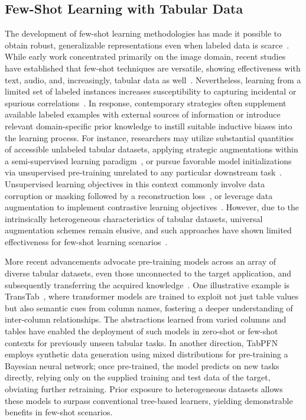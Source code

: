 \subsection{Few-Shot Learning with Tabular Data} The development of few-shot learning methodologies has made it possible to obtain robust, generalizable representations even when labeled data is scarce~\cite{chen2018closer}. While early work concentrated primarily on the image domain, recent studies have established that few-shot techniques are versatile, showing effectiveness with text, audio, and, increasingly, tabular data as well~\cite{majumder2022few,nam2023stunt,schick2021exploiting}. Nevertheless, learning from a limited set of labeled instances increases susceptibility to capturing incidental or spurious correlations~\cite{bartlett2021deep}. In response, contemporary strategies often supplement available labeled examples with external sources of information or introduce relevant domain-specific prior knowledge to instill suitable inductive biases into the learning process. For instance, researchers may utilize substantial quantities of accessible unlabeled tabular datasets, applying strategic augmentations within a semi-supervised learning paradigm~\cite{ucar2021subtab,yoon2020vime}, or pursue favorable model initializations via unsupervised pre-training unrelated to any particular downstream task~\cite{somepalli2021saint}. Unsupervised learning objectives in this context commonly involve data corruption or masking followed by a reconstruction loss~\cite{arik2021tabnet,majmundar2022met}, or leverage data augmentation to implement contrastive learning objectives~\cite{bahri2022scarf,chen2020simple}. However, due to the intrinsically heterogeneous characteristics of tabular datasets, universal augmentation schemes remain elusive, and such approaches have shown limited effectiveness for few-shot learning scenarios~\cite{nam2023stunt}.

More recent advancements advocate pre-training models across an array of diverse tabular datasets, even those unconnected to the target application, and subsequently transferring the acquired knowledge~\cite{zhang2023generative,levin2022transfer,zhu2023xtab}. One illustrative example is TransTab~\cite{wang2022transtab}, where transformer models are trained to exploit not just table values but also semantic cues from column names, fostering a deeper understanding of inter-column relationships. The abstractions learned from varied columns and tables have enabled the deployment of such models in zero-shot or few-shot contexts for previously unseen tabular tasks. In another direction, TabPFN~\cite{hollmann2022tabpfn} employs synthetic data generation using mixed distributions for pre-training a Bayesian neural network; once pre-trained, the model predicts on new tasks directly, relying only on the supplied training and test data of the target, obviating further retraining. Prior exposure to heterogeneous datasets allows these models to surpass conventional tree-based learners, yielding demonstrable benefits in few-shot scenarios.

